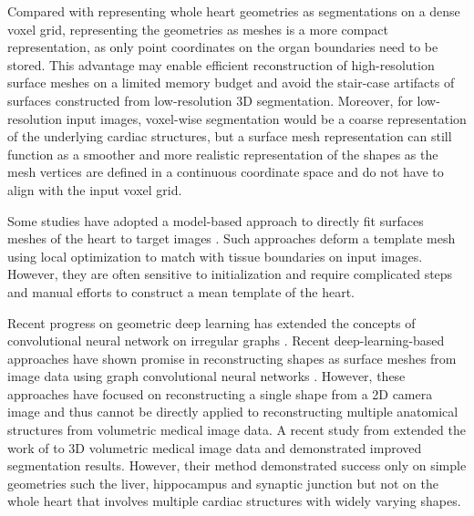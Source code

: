 \documentclass[times,review,preprint,authoryear]{elsarticle}
\begin{document}
Compared with representing whole heart geometries as segmentations on a dense voxel grid, representing the geometries as meshes is a more compact representation, as only point coordinates on the organ boundaries need to be stored. This advantage may enable efficient reconstruction of high-resolution surface meshes on a limited memory budget and avoid the stair-case artifacts of surfaces constructed from low-resolution 3D segmentation. Moreover, for low-resolution input images, voxel-wise segmentation would be a coarse representation of the underlying cardiac structures, but a surface mesh representation can still function as a smoother and more realistic representation of the shapes as the mesh vertices are defined in a continuous coordinate space and do not have to align with the input voxel grid. 

Some studies have adopted a model-based approach to directly fit surfaces meshes of the heart to target images \citep{Ecabert2008, ECABERT2011863, PETERS201070}. Such approaches deform a template mesh using local optimization to match with tissue boundaries on input images. However, they are often sensitive to initialization and require complicated steps and manual efforts to construct a mean template of the heart.  

Recent progress on geometric deep learning has extended the concepts of convolutional neural network on irregular graphs \citep{Defferrard2016, Bronstein2017}. Recent deep-learning-based approaches have shown promise in reconstructing shapes as surface meshes from image data using graph convolutional neural networks \citep{Pixel2Mesh, Wen2019Pixel2MeshM3, Image2mesh}. However, these approaches have focused on reconstructing a single shape from a 2D camera image and thus cannot be directly applied to reconstructing multiple anatomical structures from volumetric medical image data. A recent study from \cite{Voxel2Mesh} extended the work of \cite{Pixel2Mesh} to 3D volumetric medical image data and demonstrated improved segmentation results. However, their method demonstrated success only on simple geometries such the liver, hippocampus and synaptic junction but not on the whole heart that involves multiple cardiac structures with widely varying shapes. 
\end{document}
